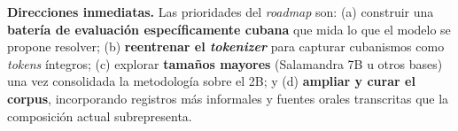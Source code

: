 \documentclass[
  spanish,
  letterpaper,
  DIV=11,
  numbers=noendperiod]{scrartcl}
\begin{document}
\textbf{Direcciones inmediatas.} Las prioridades del \emph{roadmap} son:
(a) construir una \textbf{batería de evaluación específicamente cubana}
que mida lo que el modelo se propone resolver; (b) \textbf{reentrenar el
\emph{tokenizer}} para capturar cubanismos como \emph{tokens} íntegros;
(c) explorar \textbf{tamaños mayores} (Salamandra 7B u otros bases) una
vez consolidada la metodología sobre el 2B; y (d) \textbf{ampliar y
curar el corpus}, incorporando registros más informales y fuentes orales
transcritas que la composición actual subrepresenta.
\end{document}
